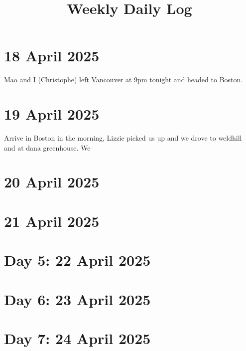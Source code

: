 \documentclass{article}
\begin{document}
\title{Weekly Daily Log}
\date{}
\maketitle

\section*{18 April 2025}
Mao and I (Christophe) left Vancouver at 9pm tonight and headed to Boston. 

\section*{19 April 2025}
Arrive in Boston in the morning, Lizzie picked us up and we drove to weldhill and at dana greenhouse. We
\section*{ 20 April 2025}
\section*{21 April 2025}

\section*{Day 5: 22 April 2025}

\section*{Day 6: 23 April 2025}


\section*{Day 7: 24 April 2025}
\end{document}
